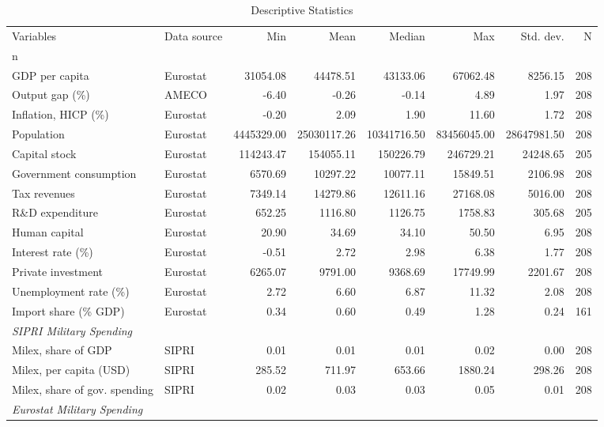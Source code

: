 \begin{table}[htbp]
\centering
\caption{Descriptive Statistics}
\label{tab:desc_stats}
\small
\begin{adjustbox}{max width=\textwidth}
\begin{tabular}{llrrrrrr}
\hline\hline
Variables & Data source & Min & Mean & Median & Max & Std. dev. & N \\n\hline
\multicolumn{8}{l}{\textit{GDP and Controls}} \\
GDP per capita & Eurostat & 31054.08 & 44478.51 & 43133.06 & 67062.48 & 8256.15 & 208 \\
Output gap (\%) & AMECO & -6.40 & -0.26 & -0.14 & 4.89 & 1.97 & 208 \\
Inflation, HICP (\%) & Eurostat & -0.20 & 2.09 & 1.90 & 11.60 & 1.72 & 208 \\
Population & Eurostat & 4445329.00 & 25030117.26 & 10341716.50 & 83456045.00 & 28647981.50 & 208 \\
Capital stock & Eurostat & 114243.47 & 154055.11 & 150226.79 & 246729.21 & 24248.65 & 205 \\
Government consumption & Eurostat & 6570.69 & 10297.22 & 10077.11 & 15849.51 & 2106.98 & 208 \\
Tax revenues & Eurostat & 7349.14 & 14279.86 & 12611.16 & 27168.08 & 5016.00 & 208 \\
R\&D expenditure & Eurostat & 652.25 & 1116.80 & 1126.75 & 1758.83 & 305.68 & 205 \\
Human capital & Eurostat & 20.90 & 34.69 & 34.10 & 50.50 & 6.95 & 208 \\
Interest rate (\%) & Eurostat & -0.51 & 2.72 & 2.98 & 6.38 & 1.77 & 208 \\
Private investment & Eurostat & 6265.07 & 9791.00 & 9368.69 & 17749.99 & 2201.67 & 208 \\
Unemployment rate (\%) & Eurostat & 2.72 & 6.60 & 6.87 & 11.32 & 2.08 & 208 \\
Import share (\% GDP) & Eurostat & 0.34 & 0.60 & 0.49 & 1.28 & 0.24 & 161 \\
\multicolumn{8}{l}{\textit{SIPRI Military Spending}} \\
Milex, share of GDP & SIPRI & 0.01 & 0.01 & 0.01 & 0.02 & 0.00 & 208 \\
Milex, per capita (USD) & SIPRI & 285.52 & 711.97 & 653.66 & 1880.24 & 298.26 & 208 \\
Milex, share of gov. spending & SIPRI & 0.02 & 0.03 & 0.03 & 0.05 & 0.01 & 208 \\
\multicolumn{8}{l}{\textit{Eurostat Military Spending}} \\

\end{tabular}
\end{adjustbox}
\end{table}
